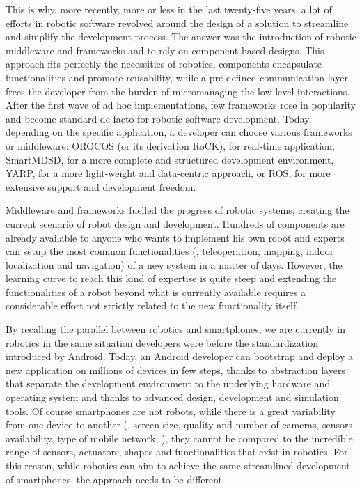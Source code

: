 This is why, more recently, more or less in the last twenty-five years, a lot of efforts in robotic software revolved around the design of a solution to streamline and simplify the development process. The answer was the introduction of robotic middleware and frameworks and to rely on component-based designs. This approach fits perfectly the necessities of robotics, components encapsulate functionalities and promote reusability, while a pre-defined communication layer frees the developer from the burden of micromanaging the low-level interactions. After the first wave of ad hoc implementations, few frameworks rose in popularity and become standard de-facto for robotic software development. Today, depending on the specific application, a developer can choose various frameworks or middleware: OROCOS (or its derivation RoCK), for real-time application, SmartMDSD, for a more complete and structured development environment, YARP, for a more light-weight and data-centric approach, or ROS, for more extensive support and development freedom.

Middleware and frameworks fuelled the progress of robotic systems, creating the current scenario of robot design and development. Hundreds of components are already available to anyone who wants to implement his own robot and experts can setup the most common functionalities (\ie, teleoperation, mapping, indoor localization and navigation) of a new system in a matter of days. However, the learning curve to reach this kind of expertise is quite steep and extending the functionalities of a robot beyond what is currently available requires a considerable effort not strictly related to the new functionality itself.

By recalling the parallel between robotics and smartphones, we are currently in robotics in the same situation developers were before the standardization introduced by Android. Today, an Android developer can bootstrap and deploy a new application on millions of devices in few steps, thanks to abstraction layers that separate the development environment to the underlying hardware and operating system and thanks to advanced design, development and simulation tools. Of course smartphones are not robots, while there is a great variability from one device to another (\eg, screen size, quality and number of cameras, sensors availability, type of mobile network, \etc), they cannot be compared to the incredible range of sensors, actuators, shapes and functionalities that exist in robotics. For this reason, while robotics can aim to achieve the same streamlined development of smartphones, the approach needs to be different.

